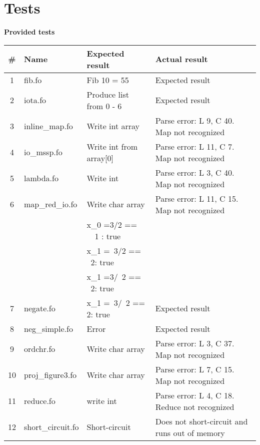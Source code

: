 \documentclass[12pt]{article}
\begin{document}
\section{Tests}
\textbf{Provided tests}
\begin{table}[ht]
\centering
\label{my-label}
\begin{tabular}{|c|l|l|l|}
\hline
# & \textbf{Name}  & \textbf{Expected result}  & \textbf{Actual result} \\ \hline
1 & fib.fo             & Fib 10 = 55  &  Expected result \\ \hline
2 & iota.fo            & Produce list from 0 - 6  & Expected result  \\ \hline
3 & inline\_map.fo     & Write int array  & Parse error: L 9, C 40. Map not recognized \\ \hline
4 & io\_mssp.fo        & Write int from array[0]  & Parse error: L 11, C 7. Map not recognized  \\ \hline
5 & lambda.fo          & Write int  & Parse error: L 3, C 40. Map not recognized \\ \hline
6 & map\_red\_io.fo    & Write char array  & Parse error: L 11, C 15. Map not recognized  \\ \hline
   &                   & x_0 =3/2 == \ \ 1  : true   &  \\ 
   &                   & x_1 =~3/2 == ~2: true & \\ 
   &                   & x_1 =3/~2 == ~2: true & \\ 
7  & negate.fo         & x_1 =~3/~2 == 2: true & Expected result \\ \hline
8 & neg\_simple.fo     & Error  & Expected result  \\ \hline
9 & ordchr.fo          & Write char array  & Parse error: L 3, C 37. Map not recognized  \\ \hline
10 & proj\_figure3.fo  & Write char array  & Parse error: L 7, C 15. Map not recognized  \\ \hline
11 & reduce.fo         & write int  &  Parse error: L 4, C 18. Reduce not recognized \\ \hline
12 & short\_circuit.fo & Short-circuit  &  Does not short-circuit and runs out of memory \\ \hline
\end{tabular}
\end{table}
\end{document}

